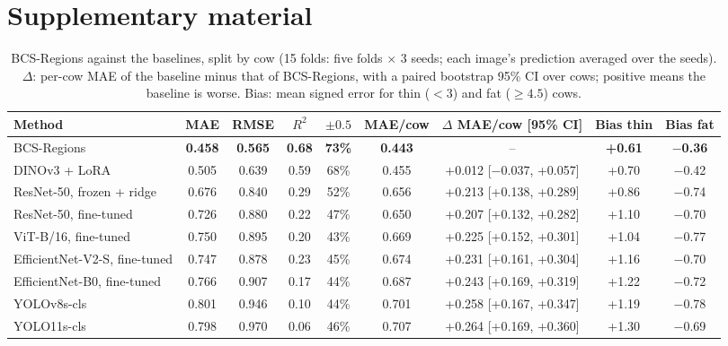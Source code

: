 \clearpage
\section*{Supplementary material}
\setcounter{table}{0}\setcounter{figure}{0}
\renewcommand{\thetable}{S\arabic{table}}\renewcommand{\thefigure}{S\arabic{figure}}

\begin{table}[h]
  \centering
  \caption{BCS-Regions against the baselines, split by cow (15 folds: five folds $\times$ 3 seeds; each image's prediction averaged over the seeds). $\Delta$: per-cow MAE of the baseline minus that of BCS-Regions, with a paired bootstrap 95\% CI over cows; positive means the baseline is worse. Bias: mean signed error for thin ($<3$) and fat ($\geq4.5$) cows.}
  \label{tab:S1}
  \begin{tabular}{lcccccccc}
    \toprule
    Method & MAE & RMSE & $R^2$ & $\pm0.5$ & MAE/cow & $\Delta$ MAE/cow [95\% CI] & Bias thin & Bias fat \\
    \midrule
    BCS-Regions & \textbf{0.458} & \textbf{0.565} & \textbf{0.68} & \textbf{73\%} & \textbf{0.443} & -- & \textbf{+0.61} & \textbf{$-$0.36} \\
    DINOv3 + LoRA & 0.505 & 0.639 & 0.59 & 68\% & 0.455 & +0.012 [$-$0.037, +0.057] & +0.70 & $-$0.42 \\
    ResNet-50, frozen + ridge & 0.676 & 0.840 & 0.29 & 52\% & 0.656 & +0.213 [+0.138, +0.289] & +0.86 & $-$0.74 \\
    ResNet-50, fine-tuned & 0.726 & 0.880 & 0.22 & 47\% & 0.650 & +0.207 [+0.132, +0.282] & +1.10 & $-$0.70 \\
    ViT-B/16, fine-tuned & 0.750 & 0.895 & 0.20 & 43\% & 0.669 & +0.225 [+0.152, +0.301] & +1.04 & $-$0.77 \\
    EfficientNet-V2-S, fine-tuned & 0.747 & 0.878 & 0.23 & 45\% & 0.674 & +0.231 [+0.161, +0.304] & +1.16 & $-$0.70 \\
    EfficientNet-B0, fine-tuned & 0.766 & 0.907 & 0.17 & 44\% & 0.687 & +0.243 [+0.169, +0.319] & +1.22 & $-$0.72 \\
    YOLOv8s-cls & 0.801 & 0.946 & 0.10 & 44\% & 0.701 & +0.258 [+0.167, +0.347] & +1.19 & $-$0.78 \\
    YOLO11s-cls & 0.798 & 0.970 & 0.06 & 46\% & 0.707 & +0.264 [+0.169, +0.360] & +1.30 & $-$0.69 \\
    \bottomrule
  \end{tabular}
\end{table}

